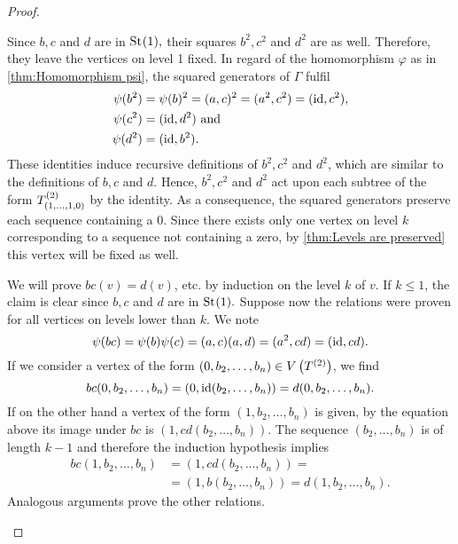 \begin{proof}
\begin{plist}
Since $b,c$ and $d$ are in $\mathrm{St}_{}(1),$ their squares $b^2,c^2$ and $d^2$ are as well. Therefore, they leave the vertices on level 1 fixed. In regard of the homomorphism $\varphi$ as in \cref{thm:Homomorphism psi}, the squared generators of $\Gamma$ fulfil
\begin{align*}
\psi(b^2)	&=\psi(b)^2=(a,c)^2=(a^2,c^2)=(\operatorname{id},c^2),\\
\psi(c^2)	&=(\operatorname{id},d^2) \text{ and}\\
\psi(d^2)	&=(\operatorname{id},b^2).
\end{align*}
These identities induce recursive definitions of $b^2,c^2$ and $d^2$, which are similar to the definitions of $b,c$ and $d$. Hence, $b^2,c^2$ and $d^2$ act upon each subtree of the form $T^{(2)}_{(1,\ldots,1,0)}$ by the identity. As a consequence, the squared generators preserve each sequence containing a 0. Since there exists only one vertex on level $k$ corresponding to a sequence not containing a zero, by \cref{thm:Levels are preserved} this vertex will be fixed as well.
\item We will prove $bc(v)=d(v)$, etc. by induction on the level $k$ of $v$.  If $k\leq 1$, the claim is clear since $b,c$ and $d$ are in $\mathrm{St}_{}(1).$ Suppose now the relations were proven for all vertices on levels lower than $k.$ We note
\begin{equation*}
\psi(bc)=\psi(b)\psi(c)=(a,c)(a,d)=(a^2,cd)=(\operatorname{id},cd).
\end{equation*}
If we consider a vertex of the form $(0,b_2,\ldots,b_n)\in V\left(T^{(2)}\right)$, we find
\begin{equation*}
bc(0,b_2,\ldots,b_n)=(0,\operatorname{id}(b_2,\ldots,b_n))=d(0,b_2,\ldots,b_n).
\end{equation*}
If on the other hand a vertex of the form $(1,b_2,\ldots,b_n)$ is given, by the equation above its image under $bc$ is  $(1,cd(b_2,\ldots,b_n)).$ The sequence $(b_2,\ldots,b_n)$ is of length $k-1$ and therefore the induction hypothesis implies
\begin{align*}
bc(1,b_2,\ldots,b_n)&=(1,cd(b_2,\ldots,b_n))=\\
&=(1,b(b_2,\ldots,b_n))=d(1,b_2,\ldots,b_n).
\end{align*}
Analogous arguments prove the other relations.
\end{plist}
\end{proof}

